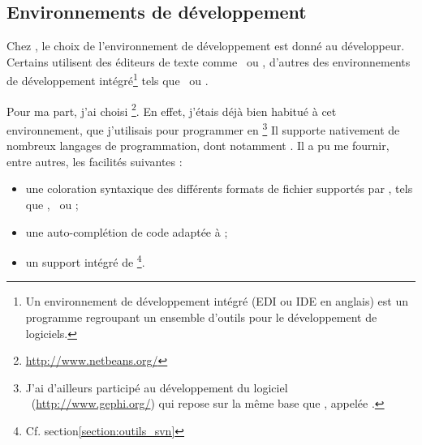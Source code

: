 \subsection{Environnements de développement}

Chez \asl, le choix de l'environnement de développement est donné au développeur. Certains utilisent des éditeurs de texte comme \aultraedit\ ou \avim, d'autres des environnements de développement intégré\footnote{Un environnement de développement intégré (EDI ou IDE en anglais) est un programme regroupant un ensemble d'outils pour le développement de logiciels.\cite{edi}} tels que \aeclipse\ ou \anetbeans.

Pour ma part, j'ai choisi \anetbeans\footnote{\url{http://www.netbeans.org/}}. En effet, j'étais déjà bien habitué à cet environnement, que j'utilisais pour programmer en \ajava\footnote{J'ai d'ailleurs participé au développement du logiciel \agephi\ (\url{http://www.gephi.org/}) qui repose sur la même base que \anetbeans, appelée \anbp.} Il supporte nativement de nombreux langages de programmation, dont notamment \aphp. Il a pu me fournir, entre autres, les facilités suivantes :

\begin{itemize}
	\item une coloration syntaxique des différents formats de fichier supportés par \asf, tels que \aphp, \ahtml\ ou \ayml ;
	\item une auto-complétion de code adaptée à \asf ;
	\item un support intégré de \asvn\footnote{Cf. section\ref{section:outils_svn}}.
\end{itemize}

